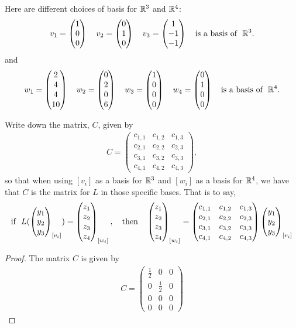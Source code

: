 \begin{question}
	\normalfont
	
	Here are different choices of basis for ${\mathbb R}^3$ and ${\mathbb R}^4$:
	\begin{align*}
		v_1 = \ColVecThree{1}{0}{0}\ \ \ 
		v_2 = \ColVecThree{0}{1}{0}\ \ \ 
		v_3 = \ColVecThree{1}{-1}{-1}\ \ \
		\text{is a basis of}\ \ \real^3. 
	\end{align*}
	and
	\begin{align*}
		w_1 = \ColVecFour{2}{4}{4}{10}\ \ \ 
		w_2 = \ColVecFour{0}{2}{0}{6}\ \ \ 
		w_3 = \ColVecFour{1}{0}{0}{0}\ \ \
		w_4 = \ColVecFour{0}{1}{0}{0}\ \ \
		\text{is a basis of}\ \ \real^4. 
	\end{align*}
	
	
	Write down the matrix, $C$, given by 
	\begin{align*}
			C = 
			 \begin{pmatrix}
			  c_{1,1} & c_{1,2} & c_{1,3} \\
			  c_{2,1} & c_{2,2} & c_{2,3} \\
			  c_{3,1} & c_{3,2} & c_{3,3} \\
			  c_{4,1} & c_{4,2} & c_{4,3} 
			 \end{pmatrix},
	\end{align*}
	so that when using $[v_i]$ as a basis for ${\mathbb R}^3$ and $[w_i]$ as a basis for ${\mathbb R}^4$, we have that $C$ is the matrix for $L$ in those specific bases.  That is to say, 
	\begin{align*}
		\text{if}\ \ L(\ColVecThree{y_1}{y_2}{y_3}_{[v_i]}) = \ColVecFour{z_1}{z_2}{z_3}{z_4}_{[w_i]},\ \ \ 
	\text{then}\ \ \ 
		\ColVecFour{z_1}{z_2}{z_3}{z_4}_{[w_i]} = 
	 \begin{pmatrix}
	  c_{1,1} & c_{1,2} & c_{1,3} \\
	  c_{2,1} & c_{2,2} & c_{2,3} \\
	  c_{3,1} & c_{3,2} & c_{3,3} \\
	  c_{4,1} & c_{4,2} & c_{4,3} 
	 \end{pmatrix}
	 \ColVecThree{y_1}{y_2}{y_3}_{[v_i]}
	\end{align*}
\end{question}

\begin{proof}
    \renewcommand{\qedsymbol}{$\blacksquare$}
    The matrix $C$ is given by
    \[
        \begin{aligned}
            C= \begin{pmatrix}
                \frac{1}{2} & 0 & 0 \\
                0 & \frac{1}{2} & 0 \\
                0 & 0 & 0 \\
                0 & 0 & 0 
			 \end{pmatrix}
        \end{aligned}
    \]
    \renewcommand{\qedsymbol}{}
\end{proof}